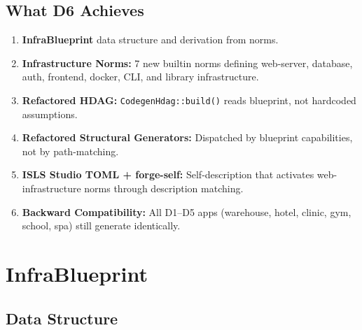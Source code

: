 \documentclass[11pt,a4paper]{article}
\begin{document}
\subsection{What D6 Achieves}

\begin{enumerate}[nosep]
\item \textbf{InfraBlueprint} data structure and derivation from norms.
\item \textbf{Infrastructure Norms:} 7 new builtin norms defining 
      web-server, database, auth, frontend, docker, CLI, and library 
      infrastructure.
\item \textbf{Refactored HDAG:} \texttt{CodegenHdag::build()} reads 
      blueprint, not hardcoded assumptions.
\item \textbf{Refactored Structural Generators:} Dispatched by 
      blueprint capabilities, not by path-matching.
\item \textbf{ISLS Studio TOML + forge-self:} Self-description that 
      activates web-infrastructure norms through description matching.
\item \textbf{Backward Compatibility:} All D1--D5 apps (warehouse, 
      hotel, clinic, gym, school, spa) still generate identically.
\end{enumerate}


\section{InfraBlueprint}
\label{sec:blueprint}

\subsection{Data Structure}
\end{document}
